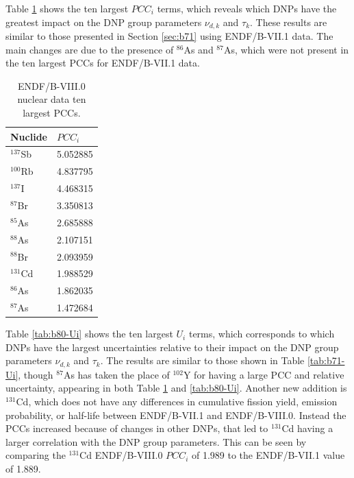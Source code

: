 Table \ref{tab:b80-PCCi} shows the ten largest $PCC_i$ terms, which reveals which \glspl{DNP} have the greatest impact on the \gls{DNP} group parameters $\nu_{d,k}$ and $\tau_k$.
These results are similar to those presented in Section \ref{sec:b71} using ENDF/B-VII.1 data.
The main changes are due to the presence of $^{86}$As and $^{87}$As, which were not present in the ten largest \glspl{PCC} for ENDF/B-VII.1 data.

\begin{table}[]
    \centering
    \caption{ENDF/B-VIII.0 nuclear data ten largest \glspl{PCC}.}
    \begin{tabular}{ll}
        \hline
       Nuclide & $PCC_{i}$ \\
       \hline
       $^{137}$Sb & 5.052885 \\
       $^{100}$Rb & 4.837795 \\
       $^{137}$I & 4.468315 \\
       $^{87}$Br & 3.350813 \\
       $^{85}$As & 2.685888 \\
       $^{88}$As & 2.107151 \\
       $^{88}$Br & 2.093959 \\
       $^{131}$Cd & 1.988529 \\
       $^{86}$As & 1.862035 \\
       $^{87}$As & 1.472684 \\
        \hline
    \end{tabular}
    \label{tab:b80-PCCi}
\end{table}

Table \ref{tab:b80-Ui} shows the ten largest $U_i$ terms, which corresponds to which \glspl{DNP} have the largest uncertainties relative to their impact on the \gls{DNP} group parameters $\nu_{d,k}$ and $\tau_k$.
The results are similar to those shown in Table \ref{tab:b71-Ui}, though $^{87}$As has taken the place of $^{102}$Y for having a large \gls{PCC} and relative uncertainty, appearing in both Table \ref{tab:b80-PCCi} and \ref{tab:b80-Ui}.
Another new addition is $^{131}$Cd, which does not have any differences in cumulative fission yield, emission probability, or half-life between ENDF/B-VII.1 and ENDF/B-VIII.0.
Instead the \glspl{PCC} increased because of changes in other \glspl{DNP}, that led to $^{131}$Cd having a larger correlation with the \gls{DNP} group parameters.
This can be seen by comparing the $^{131}$Cd ENDF/B-VIII.0 $PCC_i$ of 1.989 to the ENDF/B-VII.1 value of 1.889.

